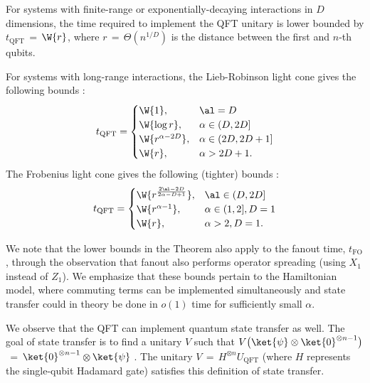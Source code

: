%
\begin{theorem*}  \label{thm:QFTlowerbounds}
  For systems with finite-range or exponentially-decaying interactions in $D$ dimensions, the time required to implement the QFT unitary is lower bounded by $t_\mathrm{QFT}$\,$= $\,$\W{r}$, where $r$\,$=$\,$\Theta(n^{1/D})$ is the distance between the first and $n$-th qubits.

  For systems with long-range interactions, the Lieb-Robinson light cone gives the following bounds \cite{kuwaharaStrictlyLinearLight2020,Tran2019a,Hastings2006,Tran2021b}:
  \begin{align}
  \label{eq:LRlowerbounds}
   t_\mathrm{QFT} =
   \begin{cases}
      \W{1}, & \al = D
      \\ \W{\log r}, & \alpha \in (D,2D]
      \\ \W{r^{\alpha-2D}}, & \alpha \in (2D,2D+1]
      \\ \W{r}, & \alpha > 2D + 1.
    \end{cases}
  \end{align}
  The Frobenius light cone gives the following (tighter) bounds \cite{Kuwahara2021,Chen2021Frobenius}:
  \begin{align}
  \label{eq:Froblowerbounds}
   t_\mathrm{QFT} =
   \begin{cases}
      \W{r^{\frac{2\al-2D}{2\alpha-D+1}}}, & \al \in (D,2D]
      \\ \W{r^{\alpha -1}}, & \alpha \in (1,2], D=1
      \\ \W{r}, & \alpha > 2, D=1.
   \end{cases}
  \end{align}
\end{theorem*}
%
We note that the lower bounds in the Theorem also apply to the fanout time, $t_\mathrm{FO}$, through the observation that fanout also performs operator spreading (using $X_1$ instead of $Z_1$).
We emphasize that these bounds pertain to the Hamiltonian model, where commuting terms can be implemented simultaneously and state transfer could in theory be done in $o(1)$ time for sufficiently small $\alpha$.

We observe that the QFT can implement quantum state transfer as well.
The goal of state transfer is to find a unitary $V$ such that
$V \bigl(\ket{\psi} \otimes \ket{0}^{\otimes n-1}\bigr)$\,$=$\,$\ket{0}^{\otimes n-1}$\,$\otimes $\,$\ket{\psi}$ \cite{Eldredge2017,Epstein2017}.
The unitary $V$\,$=$\,$H^{\otimes n} U_\mathrm{QFT}$ (where $H$ represents the single-qubit Hadamard gate) satisfies this definition of state transfer.

